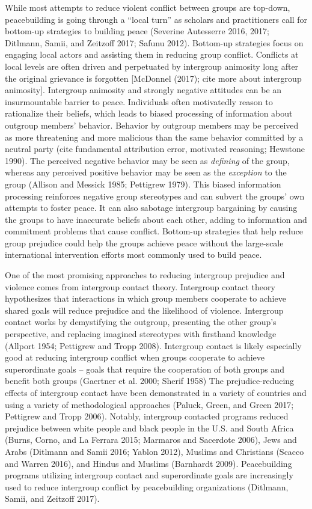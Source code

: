 \documentclass[11pt]{article}
\begin{document}
While most attempts to reduce violent conflict between groups are
top-down, peacebuilding is going through a ``local turn'' as scholars
and practitioners call for bottom-up strategies to building peace
(Severine Autesserre 2016, 2017; Ditlmann, Samii, and Zeitzoff 2017;
Safunu 2012). Bottom-up strategies focus on engaging local actors and
assisting them in reducing group conflict. Conflicts at local levels are
often driven and perpetuated by intergroup animosity long after the
original grievance is forgotten {[}McDonnel (2017); cite more about
intergroup animosity{]}. Intergroup animosity and strongly negative
attitudes can be an insurmountable barrier to peace. Individuals often
motivatedly reason to rationalize their beliefs, which leads to biased
processing of information about outgroup members' behavior. Behavior by
outgroup members may be perceived as more threatening and more malicious
than the same behavior committed by a neutral party (cite fundamental
attribution error, motivated reasoning; Hewstone 1990). The perceived
negative behavior may be seen as \emph{defining} of the group, whereas
any perceived positive behavior may be seen as the \emph{exception} to
the group (Allison and Messick 1985; Pettigrew 1979). This biased
information processing reinforces negative group stereotypes and can
subvert the groups' own attempts to foster peace. It can also sabotage
intergroup bargaining by causing the groups to have inaccurate beliefs
about each other, adding to information and commitment problems that
cause conflict. Bottom-up strategies that help reduce group prejudice
could help the groups achieve peace without the large-scale
international intervention efforts most commonly used to build peace.

One of the most promising approaches to reducing intergroup prejudice
and violence comes from intergroup contact theory. Intergroup contact
theory hypothesizes that interactions in which group members cooperate
to achieve shared goals will reduce prejudice and the likelihood of
violence. Intergroup contact works by demystifying the outgroup,
presenting the other group's perspective, and replacing imagined
stereotypes with firsthand knowledge (Allport 1954; Pettigrew and Tropp
2008). Intergroup contact is likely especially good at reducing
intergroup conflict when groups cooperate to achieve superordinate goals
-- goals that require the cooperation of both groups and benefit both
groups (Gaertner et al. 2000; Sherif 1958) The prejudice-reducing
effects of intergroup contact have been demonstrated in a variety of
countries and using a variety of methodological approaches (Paluck,
Green, and Green 2017; Pettigrew and Tropp 2006). Notably, intergroup
contacted programs reduced prejudice between white people and black
people in the U.S. and South Africa (Burns, Corno, and La Ferrara 2015;
Marmaros and Sacerdote 2006), Jews and Arabs (Ditlmann and Samii 2016;
Yablon 2012), Muslims and Christians (Scacco and Warren 2016), and
Hindus and Muslims (Barnhardt 2009). Peacebuilding programs utilizing
intergroup contact and superordinate goals are increasingly used to
reduce intergroup conflict by peacebuilding organizations (Ditlmann,
Samii, and Zeitzoff 2017).
\end{document}
